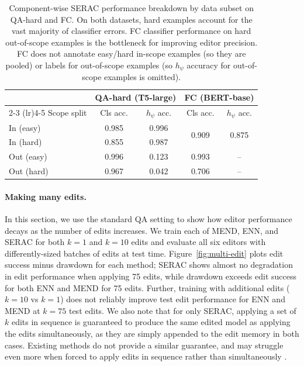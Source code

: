 \documentclass{article}
\newcommand{\rep}{h_\psi}
\newcommand{\name}{SERAC}
\begin{document}
\begin{table}
    \centering
    \small
    \begin{tabular}{lcccc}
        \toprule
        & \multicolumn{2}{c}{\textbf{QA-hard} (T5-large)} & \multicolumn{2}{c}{\textbf{FC} (BERT-base)} \\
        \cmidrule(lr){2-3} \cmidrule(lr){4-5}
        Scope split & Cls acc. & $\rep$ acc. & Cls acc. & $\rep$ acc. \\
        \midrule
        In (easy) & 0.985 & 0.996 & \multirow{2}{*}{0.909} & \multirow{2}{*}{0.875} \\
        In (hard) & 0.855 & 0.987 &  & \\
        Out (easy) & 0.996 & 0.123 & 0.993 & -- \\
        Out (hard) & 0.967 & 0.042 & 0.706 & -- \\
        \bottomrule
    \end{tabular}
    \caption{Component-wise {\name} performance breakdown by data subset on QA-hard and FC. On both datasets, hard examples account for the vast majority of classifier errors. FC classifier performance on hard out-of-scope examples is the bottleneck for improving editor precision. FC does not annotate easy/hard in-scope examples (so they are pooled) or labels for out-of-scope examples (so $\rep$ accuracy for out-of-scope examples is omitted).}
    \label{tab:decomp}
\end{table}


\paragraph{Making many edits.}
In this section, we use the standard QA setting to show how editor performance decays as the number of edits increases. We train each of MEND, ENN, and {\name} for both $k=1$ and $k=10$ edits and evaluate all six editors with differently-sized batches of edits at test time. Figure~\ref{fig:multi-edit} plots edit success minus drawdown for each method; {\name} shows almost no degradation in edit performance when applying 75 edits, while drawdown exceeds edit success for both ENN and MEND for 75 edits. Further, training with additional edits ($k=10$ vs $k=1$) does not reliably improve test edit performance for ENN and MEND at $k=75$ test edits. We also note that for only {\name}, applying a set of $k$ edits in sequence is guaranteed to produce the same edited model as applying the edits simultaneously, as they are simply appended to the edit memory in both cases. Existing methods do not provide a similar guarantee, and may struggle even more when forced to apply edits in sequence rather than simultaneously \citet{hase2021language}.
\end{document}

